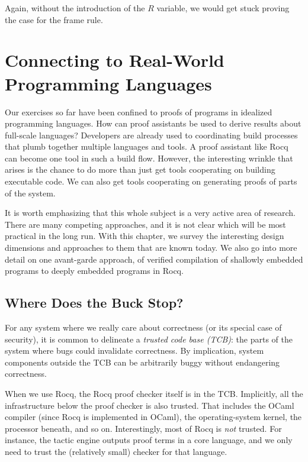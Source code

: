 \documentclass{amsbook}
\theoremstyle{definition}
\theoremstyle{remark}
\numberwithin{section}{chapter}
\numberwithin{equation}{chapter}
\begin{document}
Again, without the introduction of the $R$ variable, we would get stuck proving the case for the frame rule.



\chapter{Connecting to Real-World Programming Languages}

Our exercises so far have been confined to proofs of programs in idealized programming languages.
How can proof assistants be used to derive results about full-scale languages?
Developers are already used to coordinating build processes that plumb together multiple languages and tools.
A proof assistant like Rocq can become one tool in such a build flow.
However, the interesting wrinkle that arises is the chance to do more than just get tools cooperating on building executable code.
We can also get tools cooperating on generating proofs of parts of the system.

It is worth emphasizing that this whole subject is a very active area of research.
There are many competing approaches, and it is not clear which will be most practical in the long run.
With this chapter, we survey the interesting design dimensions and approaches to them that are known today.
We also go into more detail on one avant-garde approach, of verified compilation of shallowly embedded programs to deeply embedded programs in Rocq.

\section{Where Does the Buck Stop?}

For any system where we really care about correctness (or its special case of security), it is common to delineate a \emph{trusted code base (TCB)}: the parts of the system where bugs could invalidate correctness.
By implication, system components outside the TCB can be arbitrarily buggy without endangering correctness.

When we use Rocq, the Rocq proof checker itself is in the TCB.
Implicitly, all the infrastructure below the proof checker is also trusted.
That includes the OCaml compiler (since Rocq is implemented in OCaml), the operating-system kernel, the processor beneath, and so on.
Interestingly, most of Rocq is \emph{not} trusted.
For instance, the tactic engine outputs proof terms in a core language, and we only need to trust the (relatively small) checker for that language.
\end{document}
